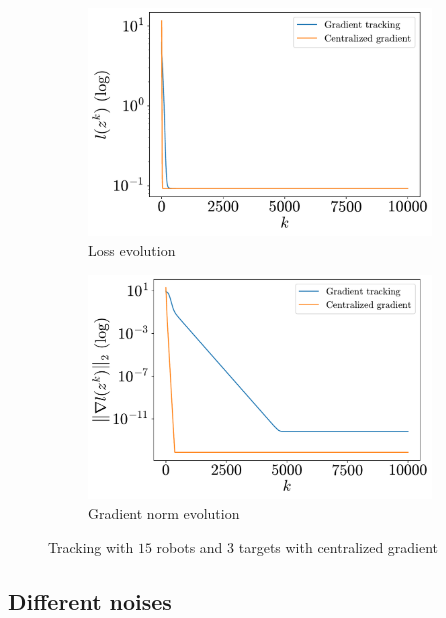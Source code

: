 \documentclass[a4paper,11pt,oneside]{book}
\begin{document}
\begin{figure}[tb!]
      \centering
      \begin{subfigure}[t]{0.46\linewidth}
            \centering
            \includegraphics[width=\linewidth]{./figs/tracking/centralized/loss.pdf} 
            \caption{Loss evolution}
      \end{subfigure}
      \hfill
      \begin{subfigure}[t]{0.46\linewidth}
            \centering
            \includegraphics[width=\linewidth]{./figs/tracking/centralized/gradient.pdf} 
            \caption{Gradient norm evolution}
      \end{subfigure}
      \caption{Tracking with $15$ robots and $3$ targets with centralized gradient}
      \label{fig:tracking_centralized_5_3}
\end{figure}


\subsection{Different noises}
\end{document}

